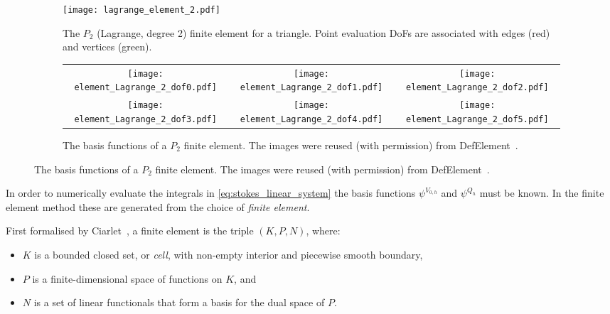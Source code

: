 \documentclass[thesis]{subfiles}
\begin{document}

\begin{figure}
  \centering
  \begin{subfigure}{.4\textwidth}
    \centering
    \texttt{[image: lagrange\_element\_2.pdf]}
    \vspace{1em}
    \caption{
      The $P_2$ (Lagrange, degree 2) finite element for a triangle.
      Point evaluation DoFs are associated with edges (red) and vertices (green).
    }
    \label{fig:lagrange_element_2}
  \end{subfigure}
  \begin{subfigure}{.58\textwidth}
    \centering
    \begin{tabular}{c c c}
      \texttt{[image: element\_Lagrange\_2\_dof0.pdf]}
      &
      \texttt{[image: element\_Lagrange\_2\_dof1.pdf]}
      &
      \texttt{[image: element\_Lagrange\_2\_dof2.pdf]}
      \\
      \texttt{[image: element\_Lagrange\_2\_dof3.pdf]}
      &
      \texttt{[image: element\_Lagrange\_2\_dof4.pdf]}
      &
      \texttt{[image: element\_Lagrange\_2\_dof5.pdf]}
    \end{tabular}
    \caption{
      The basis functions of a $P_2$ finite element.
      The images were reused (with permission) from DefElement~\cite{defelement}.
    }
    \label{fig:lagrange_element_2_basis}
  \end{subfigure}
\end{figure}

In order to numerically evaluate the integrals in \cref{eq:stokes_linear_system} the basis functions $\psi^{V_{0,h}}$ and $\psi^{Q_h}$ must be known.
In the finite element method these are generated from the choice of \textit{finite element}.

First formalised by Ciarlet~\parencite{ciarletElement2002}, a finite element is the triple $(K, P, N)$, where:

\begin{itemize}
  \item $K$ is a bounded closed set, or \textit{cell}, with non-empty interior and piecewise smooth boundary,
  \item $P$ is a finite-dimensional space of functions on $K$, and
  \item $N$ is a set of linear functionals that form a basis for the dual space of $P$.
\end{itemize}
\end{document}
